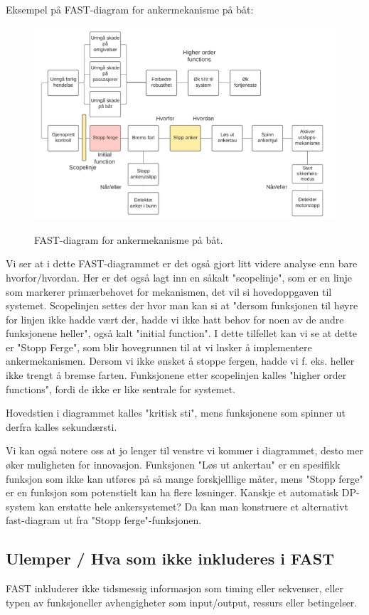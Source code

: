 Eksempel på FAST-diagram for ankermekanisme på båt:

\begin{figure}[H]
    \centering
        \includegraphics[width=\textwidth]{figures/FAST/Skjermbilde 2021-11-24 kl. 09.28.51.png}\\
        \caption{FAST-diagram for ankermekanisme på båt.}
\end{figure}

Vi ser at i dette FAST-diagrammet er det også gjort litt videre analyse enn bare hvorfor/hvordan. Her er det også lagt inn en såkalt "scopelinje", som er en linje som markerer primærbehovet for mekanismen, det vil si hovedoppgaven til systemet. Scopelinjen settes der hvor man kan si at "dersom funksjonen til høyre for linjen ikke hadde vært der, hadde vi ikke hatt behov for noen av de andre funksjonene heller", også kalt "initial function". I dette tilfellet kan vi se at dette er "Stopp Ferge", som blir hovegrunnen til at vi lnsker å implementere ankermekanismen. Dersom vi ikke ønsket å stoppe fergen, hadde vi f. eks. heller ikke trengt å bremse farten. Funksjonene etter scopelinjen kalles "higher order functions", fordi de ikke er like sentrale for systemet.

Hovedstien i diagrammet kalles "kritisk sti", mens funksjonene som spinner ut derfra kalles sekundærsti.

Vi kan også notere oss at jo lenger til venstre vi kommer i diagrammet, desto mer øker muligheten for innovasjon. Funksjonen "Løs ut ankertau" er en spesifikk funksjon som ikke kan utføres på så mange forskjelllige måter, mens "Stopp ferge" er en funksjon som potenstielt kan ha flere løsninger. Kanskje et automatisk DP-system kan erstatte hele ankersystemet? Da kan man konstruere et alternativt fast-diagram ut fra "Stopp ferge"-funksjonen.

\subsection{Ulemper / Hva som ikke inkluderes i FAST}

FAST inkluderer ikke tidsmessig informasjon som timing eller sekvenser, eller typen av funksjoneller avhengigheter som input/output, ressurs eller betingelser.